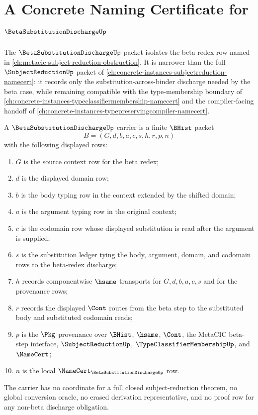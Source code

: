 \chapter{A Concrete Naming Certificate for $\BetaSubstitutionDischargeUp$}
\label{ch:concrete-instances-betasubstitutiondischarge-namecert}

The $\BetaSubstitutionDischargeUp$ packet isolates the beta-redex row named in \autoref{ch:metacic-subject-reduction-obstruction}. It is narrower than the full $\SubjectReductionUp$ packet of \autoref{ch:concrete-instances-subjectreduction-namecert}: it records only the substitution-across-binder discharge needed by the beta case, while remaining compatible with the type-membership boundary of \autoref{ch:concrete-instances-typeclassifiermembership-namecert} and the compiler-facing handoff of \autoref{ch:concrete-instances-typepreservingcompiler-namecert}.

\begin{definition}
\label{def:beta-substitution-discharge-carrier}
A $\BetaSubstitutionDischargeUp$ carrier is a finite $\BHist$ packet
$$
B=(G,d,b,a,c,s,h,r,p,n)
$$
with the following displayed rows:
\begin{enumerate}
\item $G$ is the source context row for the beta redex;
\item $d$ is the displayed domain row;
\item $b$ is the body typing row in the context extended by the shifted domain;
\item $a$ is the argument typing row in the original context;
\item $c$ is the codomain row whose displayed substitution is read after the argument is supplied;
\item $s$ is the substitution ledger tying the body, argument, domain, and codomain rows to the beta-redex discharge;
\item $h$ records componentwise $\hsame$ transports for $G,d,b,a,c,s$ and for the provenance rows;
\item $r$ records the displayed $\Cont$ routes from the beta step to the substituted body and substituted codomain reads;
\item $p$ is the $\Pkg$ provenance over $\BHist$, $\hsame$, $\Cont$, the MetaCIC beta-step interface, $\SubjectReductionUp$, $\TypeClassifierMembershipUp$, and $\NameCert$;
\item $n$ is the local $\NameCert_{\BetaSubstitutionDischargeUp}$ row.
\end{enumerate}
The carrier has no coordinate for a full closed subject-reduction theorem, no global conversion oracle, no erased derivation representative, and no proof row for any non-beta discharge obligation.
\end{definition}

